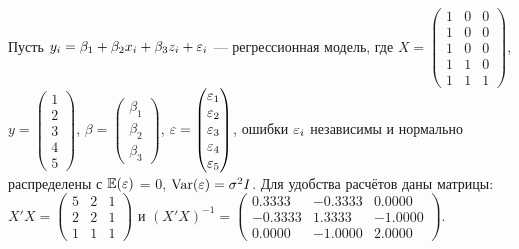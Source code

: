 \begin{problem}
Пусть $y_i = \beta_1 + \beta_2 x_{i} + \beta_3 z_{i} + \varepsilon_i$ — регрессионная модель, где $X = \begin{pmatrix} 1 & 0 & 0 \\ 1 & 0 & 0 \\ 1 & 0 & 0 \\ 1 & 1 & 0 \\ 1 & 1 & 1 \end{pmatrix}$, $y = \begin{pmatrix} 1 \\ 2 \\ 3 \\ 4 \\ 5 \end{pmatrix}$, $\beta = \begin{pmatrix} \beta_1 \\ \beta_2 \\ \beta_3 \end{pmatrix}$, $\varepsilon = \begin{pmatrix} \varepsilon_1 \\ \varepsilon_2 \\ \varepsilon_3 \\ \varepsilon_4 \\ \varepsilon_5  \end{pmatrix}$, ошибки $\varepsilon_i$ независимы и нормально распределены с $\mathbb{E}(\varepsilon)$ = 0, $\operatorname{Var}(\varepsilon) = \sigma^2 I$. Для удобства расчётов даны матрицы: $X'X = \begin{pmatrix} 5 & 2 & 1 \\ 2 & 2 & 1\\ 1 & 1 & 1 \end{pmatrix}$ и $(X'X)^{-1}= \begin{pmatrix} 0.3333 & -0.3333 & 0.0000 \\ -0.3333 & 1.3333 & -1.0000 \\ 0.0000 & -1.0000 & 2.0000 \end{pmatrix}$.



\end{problem}
